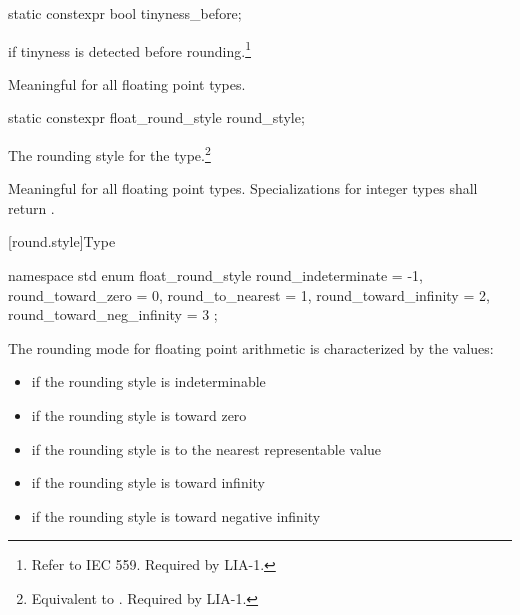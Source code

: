 \begin{itemdecl}
static constexpr bool tinyness_before;
\end{itemdecl}

\begin{itemdescr}
\pnum
{}
if tinyness is detected before rounding.\footnote{Refer to IEC 559.
Required by LIA-1.}

\pnum
Meaningful for all floating point types.
\end{itemdescr}

\begin{itemdecl}
static constexpr float_round_style round_style;
\end{itemdecl}

\begin{itemdescr}
\pnum
The rounding style for the type.\footnote{Equivalent to .
Required by LIA-1.}

\pnum
Meaningful for all floating point types.
Specializations for integer types shall return
.
\end{itemdescr}

[round.style]{Type }

%
\begin{codeblock}
namespace std {
  enum float_round_style {
    round_indeterminate       = -1,
    round_toward_zero         =  0,
    round_to_nearest          =  1,
    round_toward_infinity     =  2,
    round_toward_neg_infinity =  3
  };
}
\end{codeblock}

\pnum
The rounding mode for floating point arithmetic is characterized by the
values:

\begin{itemize}
\item
{}%
if the rounding style is indeterminable
\item
{}%
if the rounding style is toward zero
\item
{}%
if the rounding style is to the nearest representable value
\item
{}%
if the rounding style is toward infinity
\item
{}%
if the rounding style is toward negative infinity
\end{itemize}

